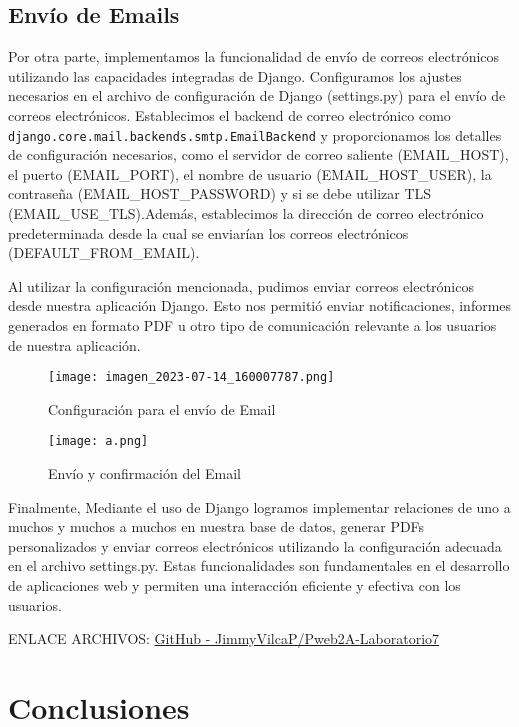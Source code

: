 \documentclass{article}
\begin{document}
\subsection{Envío de Emails}
Por otra parte, implementamos la funcionalidad de envío de correos electrónicos utilizando las capacidades integradas de Django. Configuramos los ajustes necesarios en el archivo de configuración de Django (settings.py) para el envío de correos electrónicos. Establecimos el backend de correo electrónico como \texttt{django.core.mail.backends.smtp.EmailBackend} y proporcionamos los detalles de configuración necesarios, como el servidor de correo saliente (EMAIL\_HOST), el puerto (EMAIL\_PORT), el nombre de usuario (EMAIL\_HOST\_USER), la contraseña (EMAIL\_HOST\_PASSWORD) y si se debe utilizar TLS (EMAIL\_USE\_TLS).Además, establecimos la dirección de correo electrónico predeterminada desde la cual se enviarían los correos electrónicos (DEFAULT\_FROM\_EMAIL).

Al utilizar la configuración mencionada, pudimos enviar correos electrónicos desde nuestra aplicación Django. Esto nos permitió enviar notificaciones, informes generados en formato PDF u otro tipo de comunicación relevante a los usuarios de nuestra aplicación.

\begin{figure}[h]
    \centering
    \texttt{[image: imagen\_2023-07-14\_160007787.png]}
    \caption{ Configuración para el envío de Email}
    \label{fig:enter-label}
\end{figure}
\begin{figure}[h]
    \centering
    \texttt{[image: a.png]}
    \caption{Envío y confirmación del Email}
    \label{fig:enter-label}
\end{figure}

Finalmente, Mediante el uso de Django logramos implementar relaciones de uno a muchos y muchos a muchos en nuestra base de datos, generar PDFs personalizados y enviar correos electrónicos utilizando la configuración adecuada en el archivo settings.py. Estas funcionalidades son fundamentales en el desarrollo de aplicaciones web y permiten una interacción eficiente y efectiva con los usuarios.

\vspace{10pt}
ENLACE ARCHIVOS: 
\href{https://github.com/JimmyVilcaP/Pweb2A-Laboratorio7.git}{GitHub - JimmyVilcaP/Pweb2A-Laboratorio7}

\section{Conclusiones}
\end{document}
